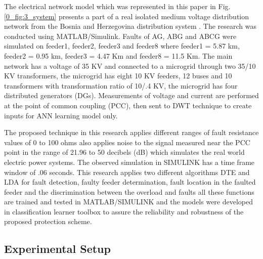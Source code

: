 \documentclass[8pt,a4paper,oneside]{elsarticle}
\begin{document}
The electrical network model which was represented in this paper in Fig. \ref{0_fig:3_system} presents a part of a real isolated medium voltage distribution network from the Bosnia and Herzegovina distribution system \cite{hubana9066305_10}. The research was conducted using MATLAB/Simulink. Faults of AG, ABG and ABCG were simulated on feeder1, feeder2, feeder3 and feeder8 where feeder1 = 5.87 km, feeder2 = 0.95 km, feeder3 = 4.47 Km and feeder8 = 11.5 Km. The main network has a voltage of 35 KV and connected to a microgrid through two 35/10 KV transformers, the microgrid has eight 10 KV feeders, 12 buses and 10 transformers with transformation ratio of  10/.4 KV, the microgrid has four distributed generators (DGs). Measurements of voltage and current are performed at the point of common coupling (PCC), then sent to DWT technique to create inputs for ANN learning model only. 


The proposed technique in this research applies different ranges of fault resistance values of 0 to 100 ohms also applies noise to the signal measured near the PCC point in the range of 21.96 to 50 decibels (dB) which simulates the real world electric power systems. The observed simulation in SIMULINK has a time frame window of .06 seconds. This research applies two different algorithms DTE and LDA for fault detection, faulty feeder determination, fault location in the faulted feeder and the discrimination between the overload and faults all these functions are trained and tested in MATLAB/SIMULINK and the models were developed in classification learner toolbox to assure the reliability and robustness of the proposed protection scheme.

\subsection{Experimental Setup}
\end{document}
